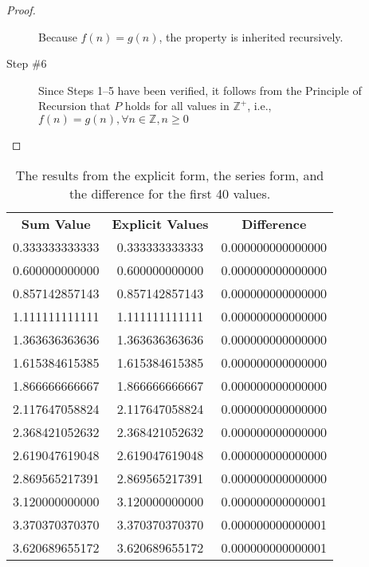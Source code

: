 \documentclass[12pt]{scrartcl}
\begin{document}
\begin{proof}
\begin{description}
            Because $f(n) = g(n)$, the property is inherited recursively.

        \item[Step \#6]  Since Steps 1--5 have been verified, it follows from the Principle of Recursion that $P$ holds for all values in $\mathbb{Z^+}$, i.e., $f(n) = g(n), \forall n \in \mathbb{Z}, n \geq 0$
    \end{description}
\end{proof}

\begin{table}[H]
    \centering
    \caption{The results from the explicit form, the series form, and the difference for the first \num{40} values.}
    \begin{tabular}{ccc}
        \textbf{Sum Value}    & \textbf{Explicit Values} & \textbf{Difference}  \\
        \num{0.333333333333} &  \num{0.333333333333} & \num{0.000000000000000} \\
        \num{0.600000000000} &  \num{0.600000000000} & \num{0.000000000000000} \\
        \num{0.857142857143} &  \num{0.857142857143} & \num{0.000000000000000} \\
        \num{1.111111111111} &  \num{1.111111111111} & \num{0.000000000000000} \\
        \num{1.363636363636} &  \num{1.363636363636} & \num{0.000000000000000} \\
        \num{1.615384615385} &  \num{1.615384615385} & \num{0.000000000000000} \\
        \num{1.866666666667} &  \num{1.866666666667} & \num{0.000000000000000} \\
        \num{2.117647058824} &  \num{2.117647058824} & \num{0.000000000000000} \\
        \num{2.368421052632} &  \num{2.368421052632} & \num{0.000000000000000} \\
        \num{2.619047619048} &  \num{2.619047619048} & \num{0.000000000000000} \\
        \num{2.869565217391} &  \num{2.869565217391} & \num{0.000000000000000} \\
        \num{3.120000000000} &  \num{3.120000000000} & \num{0.000000000000001} \\
        \num{3.370370370370} &  \num{3.370370370370} & \num{0.000000000000001} \\
        \num{3.620689655172} &  \num{3.620689655172} & \num{0.000000000000001} \\

\end{tabular}
\end{table}
\end{document}
